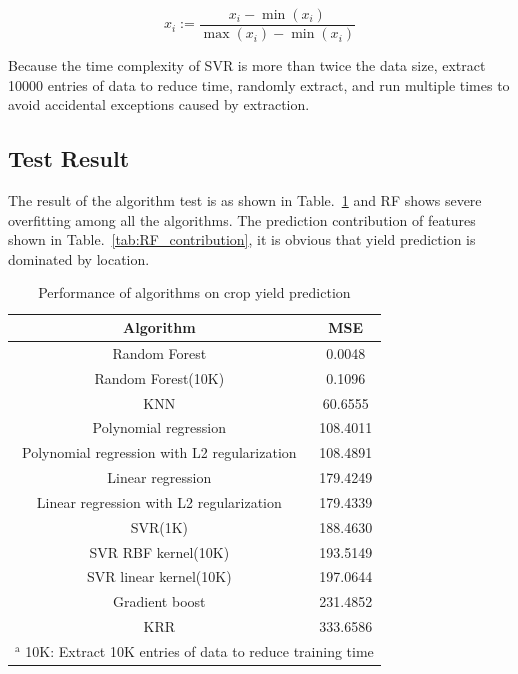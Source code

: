 \documentclass[conference]{IEEEtran}
\begin{document}
\begin{equation}
  x_i := \frac{x_i-\min \left( x_i \right)}{\max \left( x_i \right) -\min \left( x_i \right)}
\label{eq:standarlize}
\end{equation}

  Because the time complexity of SVR is more than twice the data size\cite{clarke2005analysis}, extract 10000 entries of data to reduce time, randomly extract, and run multiple times to avoid accidental exceptions caused by extraction.



\subsection{Test Result}
  The result of the algorithm test is as shown in Table.~\ref{tab:result} and RF shows severe overfitting among all the algorithms. The prediction contribution of features shown in Table.~\ref{tab:RF_contribution}, it is obvious that yield prediction is dominated by location.

\begin{table}[htbp]
  \caption{Performance of algorithms on crop yield prediction}
  \begin{center}
  \begin{tabular}{|c|c|}
  \hline
  Algorithm                                    & MSE      \\
  \hline
  Random Forest \cite{liaw2002classification}                               & 0.0048   \\
  Random Forest(10K)                           & 0.1096   \\
  KNN \cite{peterson2009k}                                         & 60.6555  \\
  Polynomial regression  \cite{theil1992rank}                      & 108.4011 \\
  Polynomial regression with L2 regularization & 108.4891 \\
  Linear regression \cite{vapnik2013nature}                           & 179.4249 \\
  Linear regression with L2 regularization     & 179.4339 \\
  SVR(1K) \cite{drucker1997support}                                     & 188.4630 \\
  SVR RBF kernel(10K) \cite{cristianini2000introduction}                         & 193.5149 \\
  SVR linear kernel(10K) \cite{cristianini2000introduction}                      & 197.0644 \\
  Gradient boost \cite{ke2017lightgbm}                              & 231.4852 \\
  KRR  \cite{saunders1998ridge}                                        & 333.6586 \\
  \hline
  \multicolumn{2}{l}{$^{\mathrm{a}}$ 10K: Extract 10K entries of data to reduce training time} \\
  \end{tabular}
  \label{tab:result}
  \end{center}
\end{table}
\end{document}
